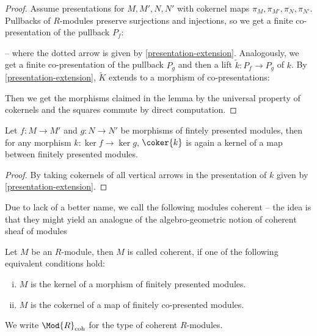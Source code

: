 \begin{proof}
  Assume presentations for $M,M',N,N'$ with cokernel maps $\pi_M,\pi_{M'},\pi_N,\pi_{N'}$.
  Pullbacks of $R$-modules preserve surjections and injections, so we get a finite co-presentation of the pullback $P_f$:
  \begin{center}
  \end{center}
  -- where the dotted arrow is given by \cref{presentation-extension}.
  Analogously, we get a finite co-presentation of the pullback $P_g$ and then a lift $\tilde{k}:P_f\to P_g$ of $k$.
  By \cref{presentation-extension}, $\tilde{K}$ extends to a morphism of co-presentations:
  \begin{center}
  \end{center}
  Then we get the morphisms claimed in the lemma by the universal property of cokernels and the squares commute by direct computation.
\end{proof}

\begin{lemma}
  \label{cokernel-closure}
  Let $f:M\to M'$ and $g:N\to N'$ be morphisms of fintely presented modules, then for any morphism
  $k:\ker{f}\to \ker{g}$, $\coker{k}$ is again a kernel of a map between finitely presented modules.
\end{lemma}

\begin{proof}
  By taking cokernels of all vertical arrows in the presentation of $k$ given by \cref{presentation-extension}.
\end{proof}

Due to lack of a better name, we call the following modules coherent --
the idea is that they might yield an analogue of the algebro-geometric notion of coherent sheaf of modules

\begin{definition}
  Let $M$ be an $R$-module, then $M$ is called coherent, if one of the following equivalent conditions hold:
  \begin{enumerate}[(i)]
  \item $M$ is the kernel of a morphism of finitely presented modules.
  \item $M$ is the cokernel of a map of finitely co-presented modules.
  \end{enumerate}
  We write $\Mod{R}_{\mathrm{coh}}$ for the type of coherent $R$-modules.
\end{definition}


